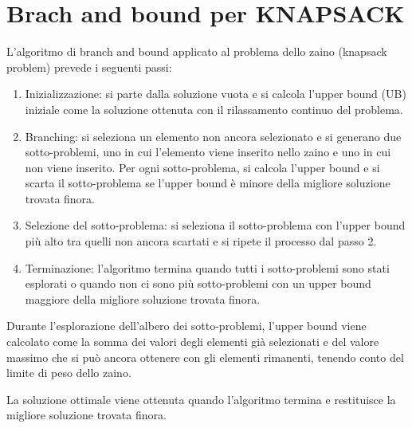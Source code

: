 \section{Brach and bound per KNAPSACK}
L'algoritmo di branch and bound applicato al problema dello zaino (knapsack problem) prevede i seguenti passi:
\begin{enumerate}
  
\item Inizializzazione: si parte dalla soluzione vuota e si calcola l'upper bound (UB) iniziale come la soluzione ottenuta con il rilassamento continuo del problema.
\item Branching: si seleziona un elemento non ancora selezionato e si generano due sotto-problemi, uno in cui l'elemento viene inserito nello zaino e uno in cui non viene inserito. Per ogni sotto-problema, si calcola l'upper bound e si scarta il sotto-problema se l'upper bound è minore della migliore soluzione trovata finora.
\item Selezione del sotto-problema: si seleziona il sotto-problema con l'upper bound più alto tra quelli non ancora scartati e si ripete il processo dal passo 2.
\item Terminazione: l'algoritmo termina quando tutti i sotto-problemi sono stati esplorati o quando non ci sono più sotto-problemi con un upper bound maggiore della migliore soluzione trovata finora.

\end{enumerate}
Durante l'esplorazione dell'albero dei sotto-problemi, l'upper bound viene calcolato come la somma dei valori degli elementi già selezionati e del valore massimo che si può ancora ottenere con gli elementi rimanenti, tenendo conto del limite di peso dello zaino.

La soluzione ottimale viene ottenuta quando l'algoritmo termina e restituisce la migliore soluzione trovata finora.

